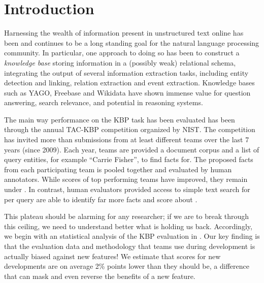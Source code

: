 \section{Introduction}
\label{sec:intro}

Harnessing the wealth of information present in unstructured text online has been and continues to be a long standing goal for the natural language processing community.
In particular, one approach to doing so has been to construct a \textit{knowledge base} storing information in a (possibly weak) relational schema, integrating the output of several information extraction tasks, including entity detection and linking, relation extraction and event extraction.
Knowledge bases such as YAGO, Freebase and Wikidata have shown immense value for question answering, search relevance, and potential in reasoning systems\needcite.


The main way performance on the KBP task has been evaluated has been through the annual TAC-KBP competition organized by NIST.\@
The competition has invited more than  submissions from at least  different teams over the last 7 years (since 2009).
Each year, teams are provided a document corpus and a list of query entities, for example ``Carrie Fisher'', to find facts for.
The proposed facts from each participating team is pooled together and evaluated by human annotators.
While scores of top performing teams have improved, they remain under .
In contrast, human evaluators provided access to simple text search for  per query are able to identify far more facts and score about .

This plateau should be alarming for any researcher; if we are to break through this ceiling, we need to understand better what is holding us back.
Accordingly, we begin with an statistical analysis of the KBP evaluation in .
Our key finding is that the evaluation data and methodology that teams use during development is actually biased against new features!
We estimate that scores for new developments are on average 2\% points lower than they should be, a difference that can mask and even reverse the benefits of a new feature.

